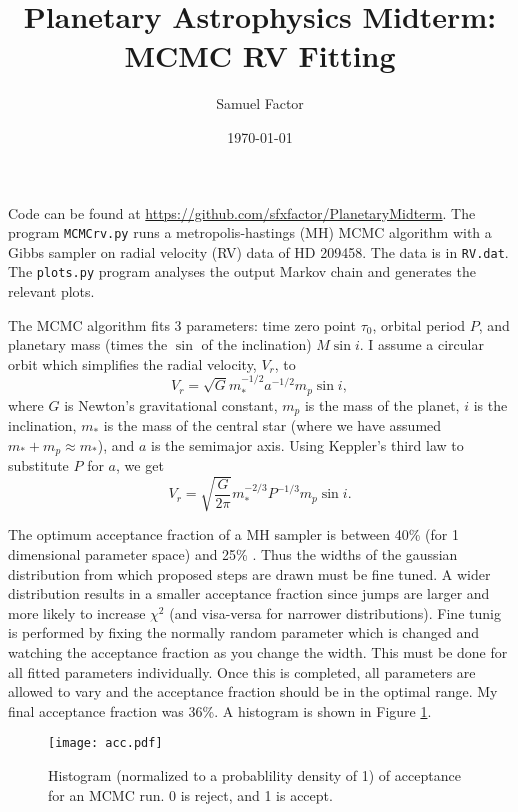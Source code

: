 \documentclass[11pt]{paper}
\title{Planetary Astrophysics Midterm:\\MCMC RV Fitting}
\author{Samuel Factor}
\date\today{}                                           %
\begin{document}
\maketitle

Code can be found at \url{https://github.com/sfxfactor/PlanetaryMidterm}. The program \texttt{MCMCrv.py} runs a metropolis-hastings (MH) MCMC algorithm with a Gibbs sampler on radial velocity (RV) data of HD 209458. The data is in \texttt{RV.dat}. The \texttt{plots.py} program analyses the output Markov chain and generates the relevant plots.

The MCMC algorithm fits 3 parameters: time zero point $\tau_0$, orbital period $P$, and planetary mass (times the $\sin$ of the inclination) $M\sin i$. I assume a circular orbit \citep[the actual value of $e$ is $0.0082^{+0.0078}_{-0.0082}$,][]{e} which simplifies the radial velocity, $V_r$, to 
\begin{equation}\label{eq:RVa}
    V_r=\sqrt{G}m_*^{-1/2}a^{-1/2}m_p\sin i,
\end{equation}
where $G$ is Newton's gravitational constant, $m_p$ is the mass of the planet, $i$ is the inclination, $m_*$ is the mass of the central star (where we have assumed $m_*+m_p\approx m_*$), and $a$ is the semimajor axis. Using Keppler's third law to substitute $P$ for $a$, we get
\begin{equation}\label{eq:RV}
    V_r=\sqrt{\frac{G}{2\pi}}m_*^{-2/3}P^{-1/3}m_p\sin i.
\end{equation}

The optimum acceptance fraction of a MH sampler is between 40\% (for 1 dimensional parameter space) and 25\% \citep[for many dimensions,][]{accfrac}. Thus the widths of the gaussian distribution from which proposed steps are drawn must be fine tuned. A wider distribution results in a smaller acceptance fraction since jumps are larger and more likely to increase $\chi^2$ (and visa-versa for narrower distributions). Fine tunig is performed by fixing the normally random parameter which is changed and watching the acceptance fraction as you change the width. This must be done for all fitted parameters individually. Once this is completed, all parameters are allowed to vary and the acceptance fraction should be in the optimal range. My final acceptance fraction was 36\%. A histogram is shown in Figure \ref{fig:acchist}.

\begin{figure}
\begin{center}
    \texttt{[image: acc.pdf]}
    \caption{Histogram (normalized to a probablility density of 1) of acceptance for an MCMC run. 0 is reject, and 1 is accept.}
    \label{fig:acchist}
\end{center}
\end{figure}
\end{document}
